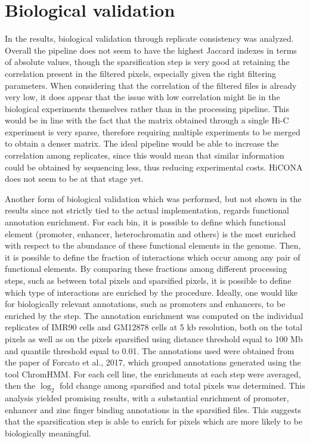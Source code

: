\section{Biological validation}

In the results, biological validation through replicate consistency was analyzed. Overall the pipeline does not seem to have the highest Jaccard indexes in terms of absolute values, though the sparsification step is very good at retaining the correlation present in the filtered pixels, especially given the right filtering parameters. When considering that the correlation of the filtered files is already very low, it does appear that the issue with low correlation might lie in the biological experiments themselves rather than in the processing pipeline. This would be in line with the fact that the matrix obtained through a single Hi-C experiment is very sparse, therefore requiring multiple experiments to be merged to obtain a denser matrix. The ideal pipeline would be able to increase the correlation among replicates, since this would mean that similar information could be obtained by sequencing less, thus reducing experimental costs. HiCONA does not seem to be at that stage yet.

Another form of biological validation which was performed, but not shown in the results since not strictly tied to the actual implementation, regards functional annotation enrichment. For each bin, it is possible to define which functional element (promoter, enhancer, heterochromatin and others) is the most enriched with respect to the abundance of these functional elements in the genome. Then, it is possible to define the fraction of interactions which occur among any pair of functional elements. By comparing these fractions among different processing steps, such as between total pixels and sparsified pixels, it is possible to define which type of interactions are enriched by the procedure. Ideally, one would like for biologically relevant annotations, such as promoters and enhancers, to be enriched by the step. The annotation enrichment was computed on the individual replicates of IMR90 cells and GM12878 cells at 5 kb resolution, both on the total pixels as well as on the pixels sparsified using distance threshold equal to 100 Mb and quantile threshold equal to 0.01. The annotations used were obtained from the paper of Forcato et al., 2017\cite{toolcomparison2017}, which grouped annotations generated using the tool ChromHMM\cite{chromhmm2014}. For each cell line, the enrichments at each step were averaged, then the $\log_2$ fold change among sparsified and total pixels was determined. This analysis yielded promising results, with a substantial enrichment of promoter, enhancer and zinc finger binding annotations in the sparsified files. This suggests that the sparsification step is able to enrich for pixels which are more likely to be biologically meaningful.

